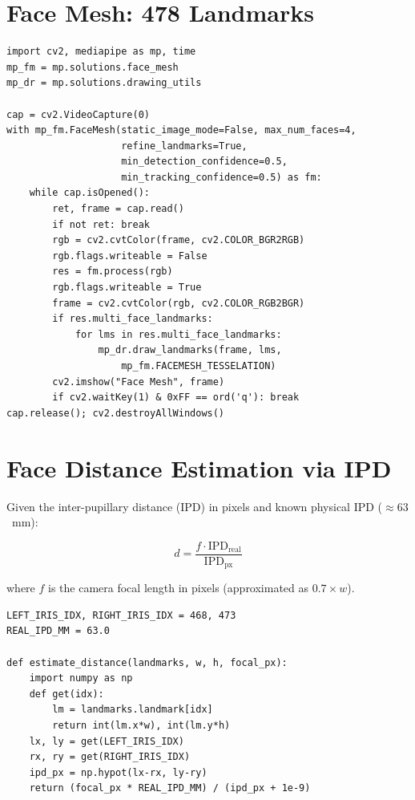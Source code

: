 \documentclass[12pt,a4paper]{article}
\begin{document}
\section{Face Mesh: 478 Landmarks}

\begin{lstlisting}[caption={Face Mesh webcam demo}]
import cv2, mediapipe as mp, time
mp_fm = mp.solutions.face_mesh
mp_dr = mp.solutions.drawing_utils

cap = cv2.VideoCapture(0)
with mp_fm.FaceMesh(static_image_mode=False, max_num_faces=4,
                    refine_landmarks=True,
                    min_detection_confidence=0.5,
                    min_tracking_confidence=0.5) as fm:
    while cap.isOpened():
        ret, frame = cap.read()
        if not ret: break
        rgb = cv2.cvtColor(frame, cv2.COLOR_BGR2RGB)
        rgb.flags.writeable = False
        res = fm.process(rgb)
        rgb.flags.writeable = True
        frame = cv2.cvtColor(rgb, cv2.COLOR_RGB2BGR)
        if res.multi_face_landmarks:
            for lms in res.multi_face_landmarks:
                mp_dr.draw_landmarks(frame, lms,
                    mp_fm.FACEMESH_TESSELATION)
        cv2.imshow("Face Mesh", frame)
        if cv2.waitKey(1) & 0xFF == ord('q'): break
cap.release(); cv2.destroyAllWindows()
\end{lstlisting}

\section{Face Distance Estimation via IPD}

Given the inter-pupillary distance (IPD) in pixels and known physical IPD ($\approx 63$~mm):

\[
    d = \frac{f \cdot \text{IPD}_{\text{real}}}{\text{IPD}_{\text{px}}}
\]

where $f$ is the camera focal length in pixels (approximated as $0.7 \times w$).

\begin{lstlisting}[caption={IPD-based distance estimator}]
LEFT_IRIS_IDX, RIGHT_IRIS_IDX = 468, 473
REAL_IPD_MM = 63.0

def estimate_distance(landmarks, w, h, focal_px):
    import numpy as np
    def get(idx):
        lm = landmarks.landmark[idx]
        return int(lm.x*w), int(lm.y*h)
    lx, ly = get(LEFT_IRIS_IDX)
    rx, ry = get(RIGHT_IRIS_IDX)
    ipd_px = np.hypot(lx-rx, ly-ry)
    return (focal_px * REAL_IPD_MM) / (ipd_px + 1e-9)
\end{lstlisting}
\end{document}
